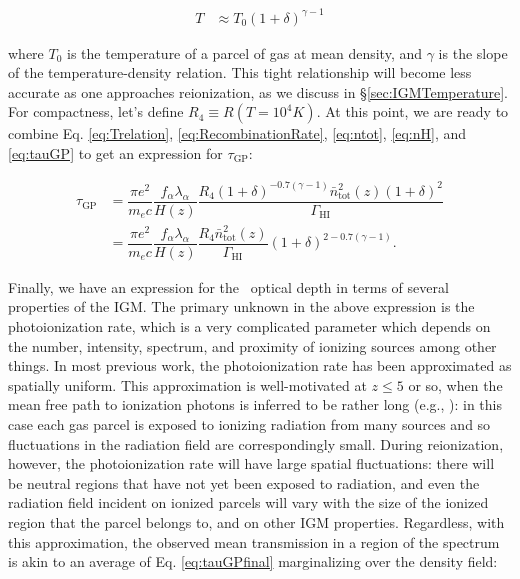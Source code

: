 \begin{align}
T &\approx T_{0}(1+\delta)^{\gamma - 1} \label{eq:Trelation}
\end{align}

where $T_0$ is the temperature of a parcel of gas at mean density, and $\gamma$ is the slope of the temperature-density relation. This tight relationship  will become less accurate as one approaches reionization, as we discuss in \S \ref{sec:IGMTemperature}. For compactness, let's define $R_{4} \equiv R(T=10^{4}K)$. At this point, we are ready to combine Eq. \ref{eq:Trelation}, \ref{eq:RecombinationRate}, \ref{eq:ntot}, \ref{eq:nH}, and \ref{eq:tauGP} to get an expression for $\tau_{\text{GP}}$:

\begin{align}
\tau_{\text{GP}} &= \dfrac{\pi e^2}{m_e c}\dfrac{f_{\alpha}\lambda_{\alpha}}{H(z)} \dfrac{R_{4}(1+\delta)^{-0.7(\gamma - 1)}\bar{n}_{\text{tot}}^{2}(z)(1+\delta)^2}{\Gamma_{\text{HI}}}\\
&= \dfrac{\pi e^2}{m_e c}\dfrac{f_{\alpha}\lambda_{\alpha}}{H(z)} \dfrac{R_4 \bar{n}_{\text{tot}}^{2}(z)}{\Gamma_{\text{HI}}} (1+\delta)^{2-0.7(\gamma-1)}. \label{eq:tauGPfinal}
\end{align}

Finally, we have an expression for the \lya\ optical depth in terms of several properties of the IGM. The primary unknown in the above expression is the photoionization rate, which is a very complicated parameter which depends on the number, intensity, spectrum, and proximity of ionizing sources among other things. In most previous work, the photoionization rate has been approximated as spatially uniform. This approximation is well-motivated at $z \leq 5$ or so, when the mean free path to ionization photons is inferred to be rather long (e.g., \citealt{Worseck:2014fya,prochaska2009direct}): in this case each gas parcel is exposed to ionizing radiation from many sources and so fluctuations in the radiation field are correspondingly small. During reionization, however, the photoionization rate will have large spatial fluctuations: there will be neutral regions that have not yet been exposed to radiation, and even the radiation field incident on ionized parcels will vary with the size of the ionized region that the parcel belongs to, and on other IGM properties. Regardless, with this approximation, the observed mean transmission in a region of the spectrum is akin to an average of Eq. \ref{eq:tauGPfinal} marginalizing over the density field:

